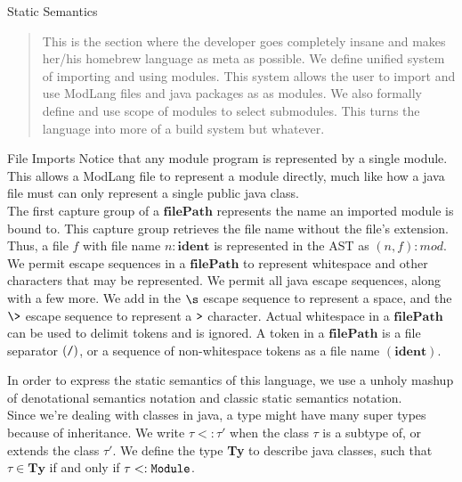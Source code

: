 \documentclass[11pt]{article}
\newcommand\IDENT{\textbf{ident}}
\newcommand\FILEPATH{\textbf{filePath}}
\begin{document}
\begin{section}{Static Semantics}
\begin{quote}
This is the section where the developer goes completely insane and makes her/his homebrew language as meta as possible. We define unified system of importing and using modules. This system allows the user to import and use ModLang files and java packages as as modules. We also formally define and use scope of modules to select submodules. This turns the language into more of a build system but whatever.
\end{quote}
\begin{subsection}{File Imports}
Notice that any module program is represented by a single module. This allows a ModLang file to represent a module directly, much like how a java file must can only represent a single public java class. \\

The first capture group of a $\FILEPATH$ represents the name an imported module is bound to. This capture group retrieves the file name without the file's extension. Thus, a file $f$ with file name $n : \IDENT$ is represented in the AST as $(n, f) : mod$.\\

We permit escape sequences in a $\FILEPATH$ to represent whitespace and other characters that may be represented. We permit all java escape sequences, along with a few more. We add in the $\verb|\s|$ escape sequence to represent a space, and the $\verb|\>|$ escape sequence to represent a $\verb|>|$ character. Actual whitespace in a $\FILEPATH$ can be used to delimit tokens and is ignored. A token in a $\FILEPATH$ is a file separator $(\verb|/|)$, or a sequence of non-whitespace tokens as a file name $(\IDENT)$.\\
\end{subsection}

In order to express the static semantics of this language, we use a unholy mashup of denotational semantics notation and classic static semantics notation.\\ 

Since we're dealing with classes in java, a type might have many super types because of inheritance. We write $\tau <: \tau'$ when the class $\tau$ is a subtype of, or extends the class $\tau'$. We define the type \textbf{Ty} to describe java classes, such that $\tau \in \textbf{Ty}$ if and only if $\tau <: \verb|Module|$.\\


\end{section}
\end{document}
